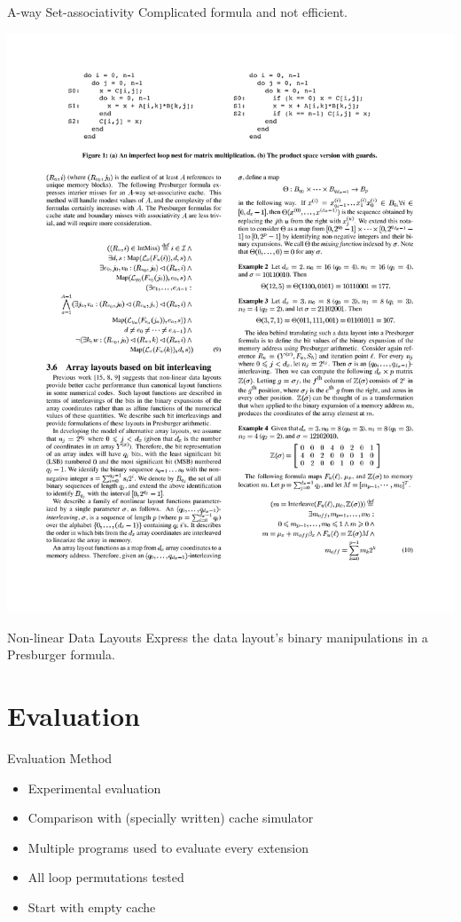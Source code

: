 \documentclass{beamer}
\begin{document}
\begin{frame}{A-way Set-associativity}
  Complicated formula and not efficient.


  \begin{center}
    \includegraphics[scale=1.1]{eq9}
  \end{center}
\end{frame}

\begin{frame}{Non-linear Data Layouts}
  Express the data layout's binary manipulations in a Presburger formula.
\end{frame}


\section{Evaluation}

\begin{frame}{Evaluation Method}
  \begin{itemize}
    \item Experimental evaluation
    \item Comparison with (specially written) cache simulator
    \item Multiple programs used to evaluate every extension
    \item All loop permutations tested
    \item Start with empty cache
  \end{itemize}
\end{frame}
\end{document}
